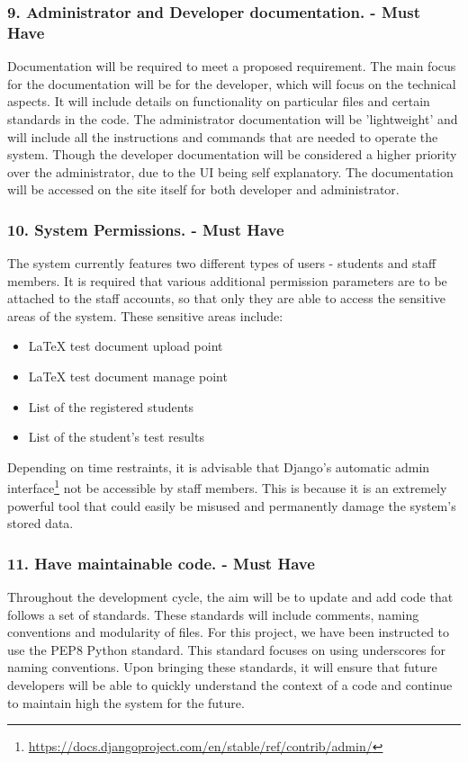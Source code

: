 	\subsubsection*{9. Administrator and Developer documentation. - Must Have}
	Documentation will be required to meet a proposed requirement. The main focus for the documentation will be for the developer, which will focus on the technical aspects. It will include details on functionality on particular files and certain standards in the code. The administrator documentation will be 'lightweight' and will include all the instructions and commands that are needed to operate the system. Though the developer documentation will be considered a higher priority over the administrator, due to the UI being self explanatory. The documentation will be accessed on the site itself for both developer and administrator. 
	\subsubsection*{10. System Permissions. - Must Have}
	The system currently features two different types of users - students and staff members. It is required that various additional permission parameters are to be attached to the staff accounts, so that only they are able to access the sensitive areas of the system. These sensitive areas include:
	\begin{itemize}  
        \item LaTeX test document upload point
        \item LaTeX test document manage point
        \item List of the registered students
        \item List of the student's test results
    \end{itemize}
    Depending on time restraints, it is advisable that Django's automatic admin interface\footnote{\url{https://docs.djangoproject.com/en/stable/ref/contrib/admin/}} not be accessible by staff members. This is because it is an extremely powerful tool that could easily be misused and permanently damage the system's stored data.
    	\subsubsection*{11. Have maintainable code. - Must Have}
	Throughout the development cycle, the aim will be to update and add code that follows a set of standards. These standards will include comments, naming conventions and modularity of files. For this project, we have been instructed to use the PEP8 Python standard. This standard focuses on using underscores for naming conventions. Upon bringing these standards, it will ensure that future developers will be able to quickly understand the context of a code and continue to maintain high the system for the future.
	
